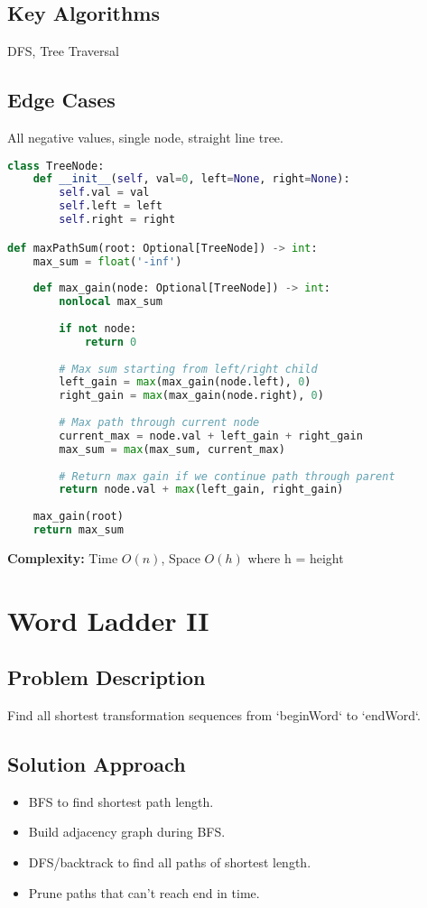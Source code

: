 \documentclass[10pt, a4paper]{article}
\begin{document}
\subsection*{Key Algorithms}
DFS, Tree Traversal

\subsection*{Edge Cases}
All negative values, single node, straight line tree.

\begin{lstlisting}[language=Python]
class TreeNode:
    def __init__(self, val=0, left=None, right=None):
        self.val = val
        self.left = left
        self.right = right

def maxPathSum(root: Optional[TreeNode]) -> int:
    max_sum = float('-inf')
    
    def max_gain(node: Optional[TreeNode]) -> int:
        nonlocal max_sum
        
        if not node:
            return 0
        
        # Max sum starting from left/right child
        left_gain = max(max_gain(node.left), 0)
        right_gain = max(max_gain(node.right), 0)
        
        # Max path through current node
        current_max = node.val + left_gain + right_gain
        max_sum = max(max_sum, current_max)
        
        # Return max gain if we continue path through parent
        return node.val + max(left_gain, right_gain)
    
    max_gain(root)
    return max_sum
\end{lstlisting}
\textbf{Complexity:} Time $O(n)$, Space $O(h)$ where h = height

\section{Word Ladder II}
\subsection*{Problem Description}
Find all shortest transformation sequences from `beginWord` to `endWord`.

\subsection*{Solution Approach}
\begin{itemize}
    \item BFS to find shortest path length.
    \item Build adjacency graph during BFS.
    \item DFS/backtrack to find all paths of shortest length.
    \item Prune paths that can't reach end in time.
\end{itemize}
\end{document}
